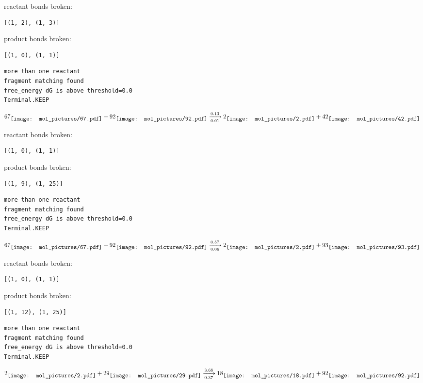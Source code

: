 \documentclass{article}
\begin{document}
reactant bonds broken:\begin{verbatim}
[(1, 2), (1, 3)]
\end{verbatim}
product bonds broken:\begin{verbatim}
[(1, 0), (1, 1)]
\end{verbatim}




\vspace{1cm}
\begin{verbatim}
more than one reactant
fragment matching found
free_energy dG is above threshold=0.0
Terminal.KEEP
\end{verbatim}
$$
67
\raisebox{-.5\height}{\texttt{[image: mol\_pictures/67.pdf]}}
+
92
\raisebox{-.5\height}{\texttt{[image: mol\_pictures/92.pdf]}}
\xrightarrow[0.01]{0.13}
2
\raisebox{-.5\height}{\texttt{[image: mol\_pictures/2.pdf]}}
+
42
\raisebox{-.5\height}{\texttt{[image: mol\_pictures/42.pdf]}}
$$


reactant bonds broken:\begin{verbatim}
[(1, 0), (1, 1)]
\end{verbatim}
product bonds broken:\begin{verbatim}
[(1, 9), (1, 25)]
\end{verbatim}




\vspace{1cm}
\begin{verbatim}
more than one reactant
fragment matching found
free_energy dG is above threshold=0.0
Terminal.KEEP
\end{verbatim}
$$
67
\raisebox{-.5\height}{\texttt{[image: mol\_pictures/67.pdf]}}
+
92
\raisebox{-.5\height}{\texttt{[image: mol\_pictures/92.pdf]}}
\xrightarrow[0.06]{0.57}
2
\raisebox{-.5\height}{\texttt{[image: mol\_pictures/2.pdf]}}
+
93
\raisebox{-.5\height}{\texttt{[image: mol\_pictures/93.pdf]}}
$$


reactant bonds broken:\begin{verbatim}
[(1, 0), (1, 1)]
\end{verbatim}
product bonds broken:\begin{verbatim}
[(1, 12), (1, 25)]
\end{verbatim}




\vspace{1cm}
\begin{verbatim}
more than one reactant
fragment matching found
free_energy dG is above threshold=0.0
Terminal.KEEP
\end{verbatim}
$$
2
\raisebox{-.5\height}{\texttt{[image: mol\_pictures/2.pdf]}}
+
29
\raisebox{-.5\height}{\texttt{[image: mol\_pictures/29.pdf]}}
\xrightarrow[0.37]{3.68}
18
\raisebox{-.5\height}{\texttt{[image: mol\_pictures/18.pdf]}}
+
92
\raisebox{-.5\height}{\texttt{[image: mol\_pictures/92.pdf]}}
$$
\end{document}
